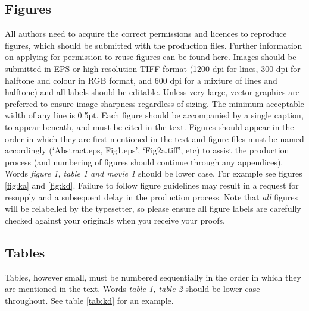 \documentclass[lineno]{jfm}
\begin{document}


\subsection{Figures}
 All authors need to acquire the correct permissions and licences to reproduce figures, which should be submitted with the production files. Further information on applying for permission to reuse figures can be found \href{https://www.cambridge.org/core/journals/journal-of-fluid-mechanics/information/request-permissions}{here}.  Images should be submitted in EPS or high-resolution TIFF format (1200 dpi for lines, 300 dpi for halftone and colour in RGB format, and 600 dpi for a mixture of lines and halftone) and all labels should be editable. Unless very large, vector graphics are preferred to ensure image sharpness regardless of sizing. The minimum acceptable width of any line is 0.5pt. Each figure should be accompanied by a single caption, to appear beneath, and must be cited in the text. Figures should appear in the order in which they are first mentioned in the text and figure files must be named accordingly (`Abstract.eps, Fig1.eps', `Fig2a.tiff', etc) to assist the production process (and numbering of figures should continue through any appendices). Words \textit {figure 1, table 1 and movie  1} should be lower case. For example see figures \ref{fig:ka} and \ref{fig:kd}.
 Failure to follow figure guidelines may result in a request for resupply and a subsequent delay in the production process. Note that {\em all} figures will be relabelled by the typesetter, so please ensure all figure labels are carefully checked against your originals when you receive your proofs.


\subsection{Tables}
 Tables, however small, must be numbered sequentially in the order in which they are mentioned in the text. Words \textit {table 1, table 2} should be lower case throughout.
 See table \ref{tab:kd} for an example.
\end{document}
